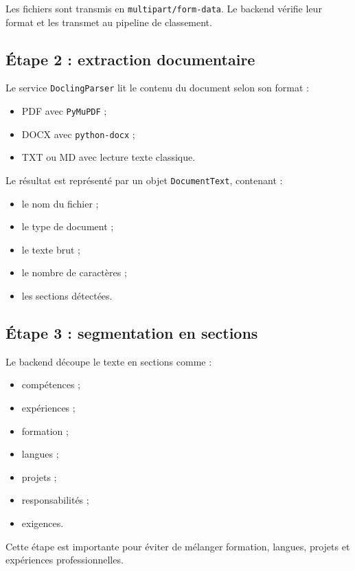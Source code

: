 \documentclass[12pt,a4paper]{report}
\begin{document}
Les fichiers sont transmis en \texttt{multipart/form-data}. Le backend vérifie leur format et les transmet au pipeline de classement.

\subsection{Étape 2 : extraction documentaire}

Le service \texttt{DoclingParser} lit le contenu du document selon son format :

\begin{itemize}
    \item PDF avec \texttt{PyMuPDF} ;
    \item DOCX avec \texttt{python-docx} ;
    \item TXT ou MD avec lecture texte classique.
\end{itemize}

Le résultat est représenté par un objet \texttt{DocumentText}, contenant :

\begin{itemize}
    \item le nom du fichier ;
    \item le type de document ;
    \item le texte brut ;
    \item le nombre de caractères ;
    \item les sections détectées.
\end{itemize}

\subsection{Étape 3 : segmentation en sections}

Le backend découpe le texte en sections comme :

\begin{itemize}
    \item compétences ;
    \item expériences ;
    \item formation ;
    \item langues ;
    \item projets ;
    \item responsabilités ;
    \item exigences.
\end{itemize}

Cette étape est importante pour éviter de mélanger formation, langues, projets et expériences professionnelles.
\end{document}
